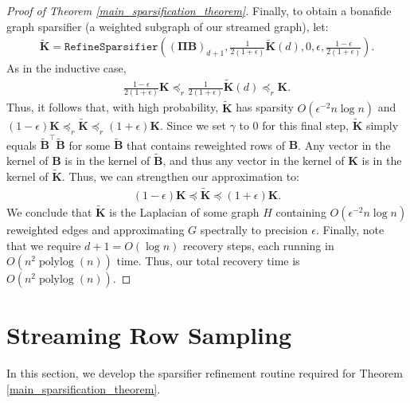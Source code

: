\documentclass[11pt]{article}
\newcommand{\bv}[1]{\mathbf{#1}}
\newcommand{\plog}{\mathop\mathrm{polylog}}
\begin{document}
\begin{proof}[Proof of Theorem \ref{main_sparsification_theorem}]
Finally, to obtain a bonafide graph sparsifier (a weighted subgraph of our streamed graph), let:
\begin{align*}
\bv{\tilde K} = \texttt{RefineSparsifier}((\bv{\Pi}\bv{B})_{d + 1}, \frac{1}{2(1+\epsilon)}\bv{\tilde K}(d), 0, \epsilon, \frac{1-\epsilon}{2(1+\epsilon)}).
\end{align*}
As in the inductive case,
\begin{align*}
\frac{1-\epsilon}{2(1+\epsilon)}\bv{K} \preceq_{r} \frac{1}{2(1+\epsilon)}\bv{\tilde K}(d) \preceq_r \bv{K}.
\end{align*}
Thus, it follows that, with high probability, $\bv{\tilde K}$ has sparsity $O( \epsilon^{-2} n\log n)$ and $(1-\epsilon)\bv{K} \preceq_{r} \bv{\tilde K} \preceq_r (1+\epsilon)\bv{K}$. Since we set $\gamma$ to 0 for this final step, $\bv{\tilde K}$ simply equals $\bv{\tilde B}^\top \bv{\tilde B}$ for some $\bv{\tilde B}$ that contains reweighted rows of $\bv{B}$. Any vector in the kernel of $\bv{B}$ is in the kernel of $\bv{\tilde B}$, and thus any vector in the kernel of $\bv{K}$ is in the kernel of $\bv{\tilde K}$. Thus, we can strengthen our approximation to:
\begin{align*}
(1-\epsilon)\bv{K} \preceq \bv{\tilde K} \preceq (1+\epsilon)\bv{K}.
\end{align*}
We conclude that $\bv{\tilde K}$ is the Laplacian of some graph $H$ containing $O(\epsilon^{-2} n\log n)$ reweighted edges and approximating $G$ spectrally to precision $\epsilon$. Finally, note that we require $d+1 = O(\log n)$ recovery steps, each running in $O(n^2\plog (n))$ time. Thus, our total recovery time is $O(n^2\plog (n))$.
\end{proof}

\section{Streaming Row Sampling}\label{streaming_row_sampling}



In this section, we develop the sparsifier refinement routine required for Theorem \ref{main_sparsification_theorem}.
\end{document}
